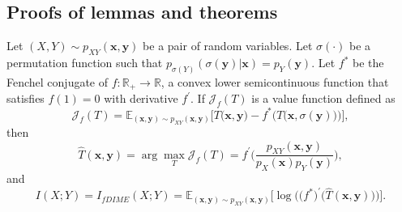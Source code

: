 \subsection{Proofs of lemmas and theorems}
\label{subsec:mi_omitted_proofs}
\begin{theorem}
Let $(X,Y) \sim p_{XY}(\mathbf{x},\mathbf{y})$ be a pair of random variables. Let $\sigma(\cdot)$ be a permutation function such that  $p_{\sigma(Y)}(\sigma(\mathbf{y})|\mathbf{x}) = p_{Y}(\mathbf{y})$. Let $f^*$ be the Fenchel conjugate of $f:\mathbb{R}_+ \to \mathbb{R}$, a convex lower semicontinuous function that satisfies $f(1)=0$ with derivative $f^{\prime}$.
If $\mathcal{J}_{f}(T)$ is a value function defined as 
\begin{equation}
\mathcal{J}_{f}(T) =  \mathbb{E}_{(\mathbf{x},\mathbf{y}) \sim p_{XY}(\mathbf{x},\mathbf{y})}\biggl[T\bigl(\mathbf{x},\mathbf{y}\bigr)-f^*\biggl(T\bigl(\mathbf{x},\sigma(\mathbf{y})\bigr)\biggr)\biggr],
\end{equation}
then
\begin{equation}
\hat{T}(\mathbf{x},\mathbf{y}) =\arg \max_T \mathcal{J}_f(T) = f^{\prime} \biggl(\frac{p_{XY}(\mathbf{x},\mathbf{y})}{p_X(\mathbf{x})p_Y(\mathbf{y})}\biggr),
\end{equation}
and
\begin{equation}
I(X;Y) = I_{fDIME}(X;Y) =  \mathbb{E}_{(\mathbf{x},\mathbf{y}) \sim p_{XY}(\mathbf{x},\mathbf{y})}\biggl[ \log \biggl(\bigl(f^{*}\bigr)^{\prime}\bigl(\hat{T}(\mathbf{x},\mathbf{y})\bigr) \biggr) \biggr].
\end{equation}
\end{theorem}
 

